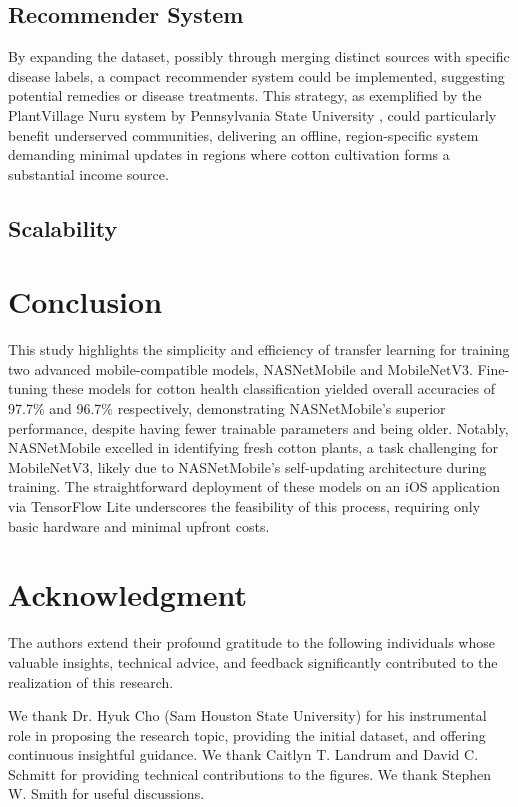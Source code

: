 \documentclass[conference]{IEEEtran}
\begin{document}
\subsection{Recommender System}

By expanding the dataset, possibly through merging distinct sources with specific disease labels, a compact recommender system could be implemented, suggesting potential remedies or disease treatments. This strategy, as exemplified by the PlantVillage Nuru system by Pennsylvania State University \cite{PlantVillage}, could particularly benefit underserved communities, delivering an offline, region-specific system demanding minimal updates in regions where cotton cultivation forms a substantial income source.

\subsection{Scalability}



\section{Conclusion}

This study highlights the simplicity and efficiency of transfer learning for training two advanced mobile-compatible models, NASNetMobile and MobileNetV3. Fine-tuning these models for cotton health classification yielded overall accuracies of 97.7\% and 96.7\% respectively, demonstrating NASNetMobile's superior performance, despite having fewer trainable parameters and being older. Notably, NASNetMobile excelled in identifying fresh cotton plants, a task challenging for MobileNetV3, likely due to NASNetMobile's self-updating architecture during training. The straightforward deployment of these models on an iOS application via TensorFlow Lite underscores the feasibility of this process, requiring only basic hardware and minimal upfront costs.

\section{Acknowledgment}

The authors extend their profound gratitude to the following individuals whose valuable insights, technical advice, and feedback significantly contributed to the realization of this research. 

We thank Dr. Hyuk Cho (Sam Houston State University) for his instrumental role in proposing the research topic, providing the initial dataset, and offering continuous insightful guidance. We thank Caitlyn T. Landrum and David C. Schmitt for providing technical contributions to the figures. We thank Stephen W. Smith for useful discussions.
\end{document}
